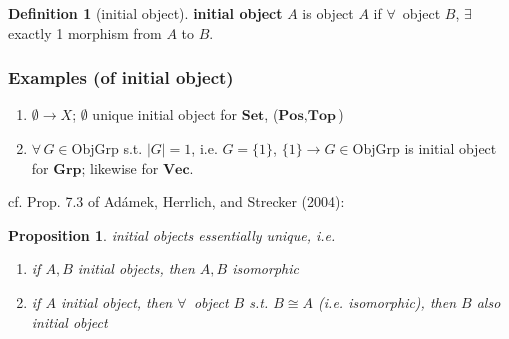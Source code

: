 \documentclass[twoside,landscape,10pt]{amsart}
\theoremstyle{plain}
\newtheorem{proposition}{Proposition}
\theoremstyle{definition}
\newtheorem{definition}{Definition}
\theoremstyle{remark}
\begin{document}
\begin{multicols*}{2}
\begin{definition}[initial object]
\textbf{initial object} $A$ is object $A$ if $\forall \, $ object $B$, $\exists \, $ exactly 1 morphism from $A$ to $B$.
\end{definition}

\subsubsection{Examples (of initial object)}
\begin{enumerate}
\item $\emptyset \to X$; $\emptyset$ unique initial object for $\mathbf{\text{Set}}$, ($\mathbf{\text{Pos}}, \mathbf{\text{Top}}$)
\item $\forall \, G \in \text{ObjGrp}$ s.t. $|G|=1$, i.e. $G=\lbrace 1 \rbrace$, $\lbrace 1 \rbrace \to G \in \text{Obj}\text{Grp}$ is initial object for $\mathbf{\text{Grp}}$; likewise for $\mathbf{\text{Vec}}$.  
\end{enumerate}

cf. Prop. 7.3 of Ad\'{a}mek, Herrlich, and Strecker (2004):
\begin{proposition}
  initial objects essentially unique, i.e. 
\begin{enumerate}
  \item if $A,B$ initial objects, then $A,B$ isomorphic 
  \item if $A$ initial object, then $\forall \, $ object $B$ s.t. $B\cong A$ (i.e. isomorphic), then $B$ also initial object
\end{enumerate}
\end{proposition}


\end{multicols*}
\end{document}
